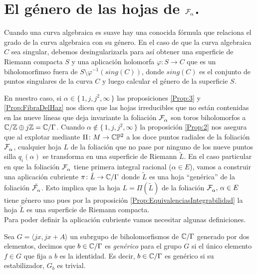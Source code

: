 \section{El género de las hojas de $\mathcal{F}^{\ }_{\alpha}$.}

Cuando una curva algebraica es suave hay una conocida fórmula que relaciona el grado de la curva algebraica con su género. En el caso de que la curva algebraica $C$ sea singular, debemos desingularizarla para así obtener una superficie de Riemann compacta $S$ y una aplicación holomorfa $\varphi\colon S\rightarrow C$ que es un biholomorfimso fuera de $S\setminus\varphi^{-1}(sing(C))$, donde $sing(C)$ es el conjunto de puntos singulares de la curva $C$ y luego calcular el género de la superficie $S$.

En nuestro caso, si $\alpha\in\{\, 1,j,j^{2},\infty \, \}$ las proposiciones \ref{Prop:3} y \ref{Prop:FibraDelHaz} nos dicen que las hojas irreducibles que no están contenidas en las nueve líneas que deja invariante la foliación $\mathcal{F}^{\ }_{\alpha}$ son toros biholomorfos a $\mathbb{C}/\mathbb{Z}\oplus j\mathbb{Z}=\mathbb{C}/\Gamma$. Cuando $\alpha\notin\{\, 1,j,j^{2},\infty \, \}$ la proposición \ref{Prop:2} nos asegura que al explotar mediante $\Pi\colon M\rightarrow \mathbb{C}\mathbb{P}^2$ a los doce puntos radiales de la foliación $\mathcal{F}^{\ }_{\alpha}$, cualquier hoja $L$ de la foliación que no pase por ninguno de los nueve puntos silla $q_{i}(\alpha)$ se transforma en una superficie de Riemann $\tilde{L}$. En el caso particular en que la foliación $\mathcal{F}^{\ }_{\alpha}$ tiene primera integral racional ($\alpha\in E$),  vamos a construir una aplicación cubriente $\pi\colon \tilde{L}\rightarrow \mathbb{C}/\Gamma$ donde $\tilde{L}$ es una hoja ``genérica'' de la foliación $\tilde{\mathcal{F}^{\ }_{\alpha}}$. Esto implica que la hoja $L=\Pi({\tilde{L}})$ de la foliación $\mathcal{F}^{\ }_{\alpha},\, \alpha\in E$ tiene género uno pues por la proposición \ref{Prop:EquivalenciasIntegrabilidad} la hoja $\tilde{L}$ es una superficie de Riemann compacta.\\

Para poder definir la aplicación cubriente vamos necesitar algunas definiciones. 
\begin{defn}
\label{Def:PuntoGenerico}
Sea $G=\langle jx,jx+A\rangle$ un subrgupo de biholomorfismos de $\mathbb{C}/\Gamma$ generado por dos elementos, decimos que $b\in\mathbb{C}/\Gamma$ es \emph{genérico} para el grupo $G$ si el único elemento $f\in G$ que fija a $b$ es la identidad. Es decir, $b\in\mathbb{C}/\Gamma$ es genérico si su estabilizador, $G_{b}$ es trivial.
\end{defn}

